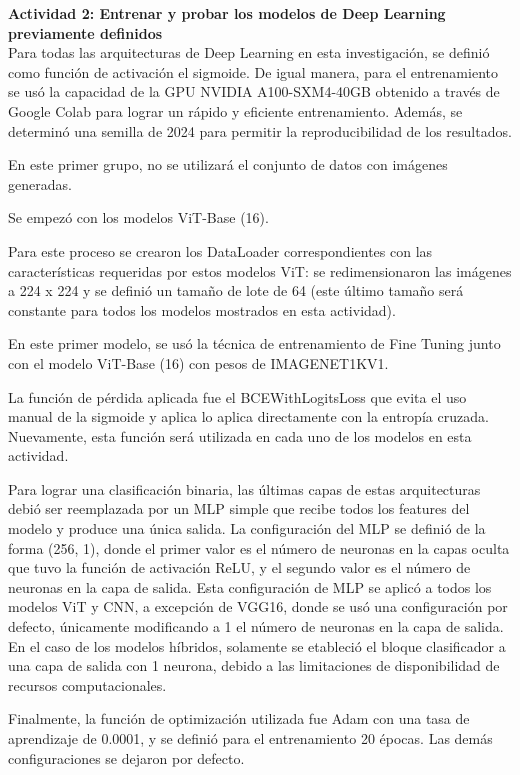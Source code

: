 \textbf{Actividad 2: Entrenar y probar los modelos de Deep Learning previamente definidos}
\\
Para todas las arquitecturas de Deep Learning en esta investigación, se definió como función de activación el sigmoide. De igual manera, para el entrenamiento se usó la capacidad de la GPU NVIDIA A100-SXM4-40GB obtenido a través de Google Colab para lograr un rápido y eficiente entrenamiento. Además, se determinó una semilla de 2024 para permitir la reproducibilidad de los resultados. 

En este primer grupo, no se utilizará el conjunto de datos con imágenes generadas.

Se empezó con los modelos ViT-Base (16).

Para este proceso se crearon los DataLoader correspondientes con las características requeridas por estos modelos ViT: se redimensionaron las imágenes a 224 x 224 y se definió un tamaño de lote de 64 (este último tamaño será constante para todos los modelos mostrados en esta actividad).

En este primer modelo, se usó la técnica de entrenamiento de Fine Tuning junto con el modelo ViT-Base (16) con pesos de IMAGENET1KV1.

La función de pérdida aplicada fue el BCEWithLogitsLoss que evita el uso manual de la sigmoide y aplica lo aplica directamente con la entropía cruzada. Nuevamente, esta función será utilizada en cada uno de los modelos en esta actividad.

Para lograr una clasificación binaria, las últimas capas de estas arquitecturas debió ser reemplazada por un MLP simple que recibe todos los features del modelo y produce una única salida. La configuración del MLP se definió de la forma (256, 1), donde el primer valor es el número de neuronas en la capas oculta que tuvo la función de activación ReLU, y el segundo valor es el número de neuronas en la capa de salida. Esta configuración de MLP se aplicó a todos los modelos ViT y CNN, a excepción de VGG16, donde se usó una configuración por defecto, únicamente modificando a 1 el número de neuronas en la capa de salida. En el caso de los modelos híbridos, solamente se etableció el bloque clasificador a una capa de salida con 1 neurona, debido a las limitaciones de disponibilidad de recursos computacionales.

Finalmente, la función de optimización utilizada fue Adam con una tasa de aprendizaje de 0.0001, y se definió para el entrenamiento 20 épocas. Las demás configuraciones se dejaron por defecto.

